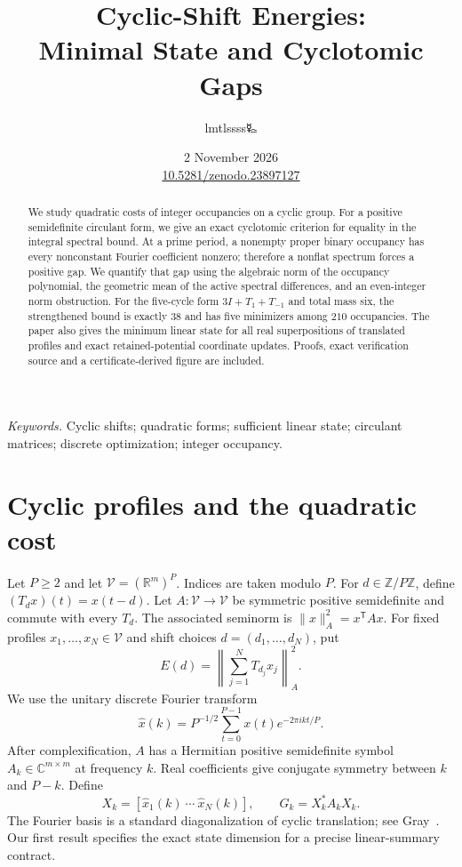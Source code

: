 \documentclass[11pt,a4paper]{article}
\title{\LARGE Cyclic-Shift Energies:\\Minimal State and Cyclotomic Gaps}
\author{lmtlssss{\authorsymbol 🜐}}
\date{2 November 2026\\[3pt]\small\href{https://doi.org/10.5281/zenodo.23897127}{10.5281/zenodo.23897127}}
\newcommand{\R}{\mathbb R}\newcommand{\C}{\mathbb C}\newcommand{\Z}{\mathbb Z}\newcommand{\N}{\mathbb N}\newcommand{\ip}[2]{\langle #1,#2\rangle}\newcommand{\norm}[1]{\lVert #1\rVert}\newcommand{\one}{\mathbf 1}
\begin{document}
\maketitle\thispagestyle{plain}

\begin{abstract}
We study quadratic costs of integer occupancies on a cyclic group. For a
positive semidefinite circulant form, we give an exact cyclotomic criterion
for equality in the integral spectral bound. At a prime period, a nonempty
proper binary occupancy has every nonconstant Fourier coefficient nonzero;
therefore a nonflat spectrum forces a positive gap. We quantify that gap
using the algebraic norm of the occupancy polynomial, the geometric mean
of the active spectral differences, and an even-integer norm obstruction.
For the five-cycle form $3I+T_1+T_{-1}$ and total mass six, the strengthened
bound is exactly $38$ and has five minimizers among $210$ occupancies.
The paper also gives the minimum linear state for all real superpositions
of translated profiles and exact retained-potential coordinate updates.
Proofs, exact verification source and a certificate-derived figure are included.
\end{abstract}
\noindent\textit{Keywords.} Cyclic shifts; quadratic forms; sufficient linear
state; circulant matrices; discrete optimization; integer occupancy.

\section{Cyclic profiles and the quadratic cost}
Let $P\ge2$ and let $\mathcal V=(\R^m)^P$. Indices are taken modulo $P$.
For $d\in\Z/P\Z$, define $(T_dx)(t)=x(t-d)$.
Let $A:\mathcal V\to\mathcal V$ be symmetric positive semidefinite and commute
with every $T_d$. The associated seminorm is
$\norm{x}_A^2=x^\mathsf T A x$.
For fixed profiles $x_1,\ldots,x_N\in\mathcal V$ and shift choices
$d=(d_1,\ldots,d_N)$, put
\begin{equation}\label{eq:cost}
 E(d)=\left\|\sum_{j=1}^N T_{d_j}x_j\right\|_A^2.
\end{equation}
We use the unitary discrete Fourier transform
\[
 \widehat x(k)=P^{-1/2}\sum_{t=0}^{P-1}x(t)e^{-2\pi i kt/P}.
\]
After complexification, $A$ has a Hermitian positive semidefinite symbol
$A_k\in\C^{m\times m}$ at frequency $k$. Real coefficients give conjugate
symmetry between $k$ and $P-k$. Define
\begin{equation}\label{eq:gram}
 X_k=[\widehat x_1(k)\ \cdots\ \widehat x_N(k)],\qquad
 G_k=X_k^*A_kX_k.
\end{equation}
The Fourier basis is a standard diagonalization of cyclic translation;
see Gray~\cite{gray}. Our first result specifies the exact state dimension
for a precise linear-summary contract.
\end{document}
